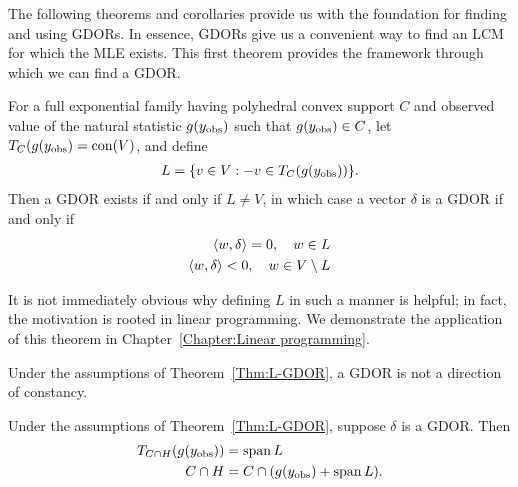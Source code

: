 The following theorems and corollaries provide us with the foundation
for finding and using GDORs.  In essence, GDORs give us a convenient way
to find an LCM for which the MLE exists.
This first theorem provides the framework through
which we can find a GDOR.  
\begin{theorem} \label{Thm:L-GDOR}
For a full exponential family having polyhedral convex support $C$ and observed value 
of the natural statistic $g(y_{\text{obs}})$ such that $g(y_{\text{obs}}) \in C$, 
let $T_C(g(y_{\text{obs}}) = \operatorname{con}(V)$, and define
\begin{align*}
	L = \{ v \in V: -v \in T_C(g(y_{\text{obs}})) \}.
\end{align*}
Then a GDOR exists if and only if $L \neq V$, in which case a vector $\delta$ is a GDOR if and 
only if
\begin{align*}
	\langle w, \delta \rangle = 0, \quad w \in L \\
	\langle w, \delta \rangle < 0, \quad w \in V \setminus L \\
\end{align*}
\end{theorem}
It is not immediately obvious why defining $L$ in such a manner is helpful; in fact,
the motivation is rooted in linear programming.  We demonstrate the application of 
this theorem in Chapter~\ref{Chapter:Linear programming}.

\begin{corollary}
Under the assumptions of Theorem~\ref{Thm:L-GDOR}, a GDOR is not a direction of constancy.
\end{corollary}

\begin{corollary} \label{Cor:spanL}
Under the assumptions of Theorem~\ref{Thm:L-GDOR}, suppose $\delta$ is a GDOR.  Then
\begin{align*}
	T_{C \cap H} (g(y_{\text{obs}})) &= \operatorname{span} L \\
	C \cap H &= C \cap (g(y_{\text{obs}}) + \operatorname{span} L ). \\
\end{align*}
\end{corollary}

